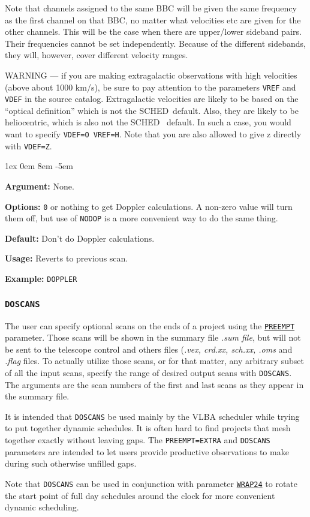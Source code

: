 \documentclass{report}
\newcommand{\schedb}{{\sc SCHED~}}
\newcommand{\rcwbox}[5]{
  \begin{list}{}{\parsep 1ex  \itemsep 0em
                 \leftmargin 8em  \itemindent -5em }
    \item {\bf Argument:} #1
    \item {\bf Options:}  #2
    \item {\bf Default:}  #3
    \item {\bf Usage:}    #4
    \item {\bf Example:}  #5
  \end{list}
}
\begin{document}
Note that channels assigned to the same BBC will be given the same
frequency as the first channel on that BBC, no matter what velocities
etc are given for the other channels.  This will be the case when
there are upper/lower sideband pairs.  Their frequencies cannot
be set independently.  Because of the different sidebands, they
will, however, cover different velocity ranges.

WARNING --- if you are making extragalactic observations with high
velocities (above about 1000 km/s), be sure to pay attention to the
parameters {\tt VREF} and {\tt VDEF} in the source catalog.
Extragalactic velocities are likely to be based on the ``optical
definition'' which is not the \schedb default.  Also, they are likely
to be heliocentric, which is also not the \schedb
default.  In such a case, you would want to specify {\tt VDEF=O
VREF=H}.  Note that you are also allowed to give z directly with
{\tt VDEF=Z}.

\rcwbox
{None.}
{{\tt 0} or nothing to get Doppler calculations. A non-zero value will
turn them off, but use of {\tt NODOP} is a more convenient way to
do the same thing.}
{Don't do Doppler calculations.}
{Reverts to previous scan.}
{{\tt DOPPLER}}

\subsubsection{\label{MP:DOSCANS}{\tt DOSCANS}}

The user can specify optional scans on the ends of a project using
the 
{\hyperref[MP:PREEMPT]{{\tt PREEMPT}}} parameter.  Those scans will
be shown in the summary file {\sl .sum file}, but will not be sent 
to the telescope control and others files ({\sl .vex, crd.xx, sch.xx,
.oms} and {\sl .flag} files.  To actually utilize those scans, or for
that matter, any arbitrary subset of all the input scans, specify
the range of desired output scans with {\tt DOSCANS}.  The arguments
are the scan numbers of the first and last scans as they appear in 
the summary file.  

It is intended that {\tt DOSCANS} be used mainly by the VLBA scheduler
while trying to put together dynamic schedules.  It is often hard to
find projects that mesh together exactly without leaving gaps.  The
{\tt PREEMPT=EXTRA} and {\tt DOSCANS} parameters are intended to let
users provide productive observations to make during such otherwise
unfilled gaps.

Note that {\tt DOSCANS} can be used in conjunction with parameter
{\hyperref[MP:WRAP24]{{\tt WRAP24}}} to rotate the start point of
full day schedules around the clock for more convenient dynamic
scheduling.
\end{document}
